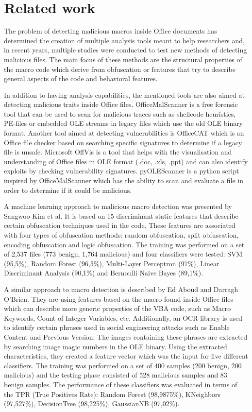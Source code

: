 \section{Related work}
The problem of detecting malicious macros inside Office documents has determined the creation of multiple analysis tools meant to help researchers and, in recent years, multiple studies were conducted to test new methods of detecting malicious files. The main focus of these methods are the structural properties of the macro code which derive from obfuscation or features that try to describe general aspects of the code and behavioral features. 
\par
In addition to having analysis capabilities, the mentioned tools are also aimed at detecting malicious traits inside Office files. OfficeMalScanner is a free forensic tool that can be used to scan for malicious traces such as shellcode heuristics, PE-files or embedded OLE streams in legacy files which use the old OLE binary format. Another tool aimed at detecting vulnerabilities is OfficeCAT which is an Office file checker based on searching specific signatures to determine if a legacy file is unsafe. Microsoft OffVis is a tool that helps with the visualisation and understanding of Office files in OLE format (.doc, .xls, .ppt) and can also identify exploits by checking vulnerability signatures. pyOLEScanner is a python script inspired by OfficeMalScanner which has the ability to scan and evaluate a file in order to determine if it could be malicious.
\par
A machine learning approach to malicious macro detection was presented by Sangwoo Kim et al. It is based on 15 discriminant static features that describe certain obfuscation techniques used in the code. These features are associated with four types of obfuscation methods: random obfuscation, split obfuscation, encoding obfuscation and logic obfuscation. The training was performed on a set of 2,537 files (773 benign, 1,764 malicious) and four classifiers were tested: SVM (95,5\%), Random Forest (96,5\%), Multi-Layer Perceptron (97\%), Linear Discriminant Analysis (90,1\%) and Bernoulli Naive Bayes (89,1\%). 
\par
A similar approach to macro detection is described by Ed Aboud and Darragh O'Brien. They are using features based on the macro found inside Office files which can describe more generic properties of the VBA code, such as Macro Keywords, Count of Integer Variables, etc. Additionally, an OCR library is used to identify certain phrases used in social engineering attacks such as Enable Content and Previous Version. The images containing these phrases are extracted by searching image magic numbers in the OLE binary. Using the extracted characteristics, they created a feature vector which was the input for five different classifiers. The training was performed on a set of 400 samples (200 benign, 200 malicious) and the testing phase consisted of 528 malicious samples and 83 benign samples. The performance of these classifiers was evaluated in terms of the TPR (True Positives Rate): Random Forest (98,9875\%), KNeighbors (97,527\%), DecisionTree (98,225\%), GaussianNB (97,02\%).

